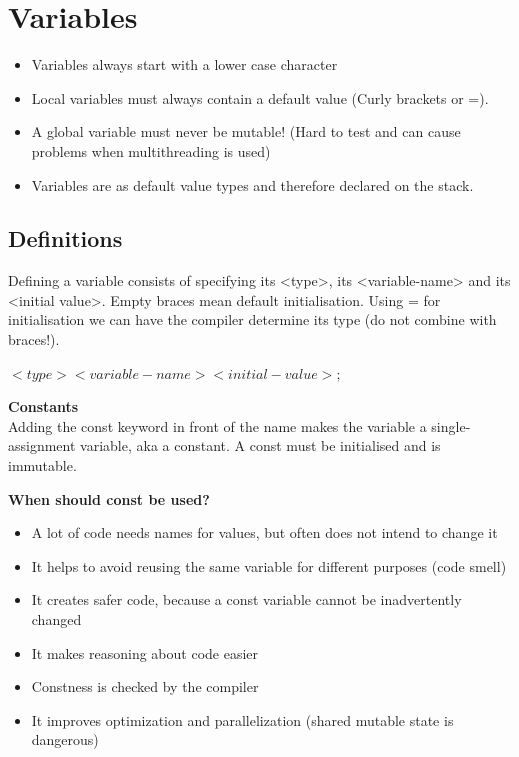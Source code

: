 
\section{Variables}
\begin{itemize}
  \itemsep -0.5em 
  \item Variables always start with a lower case character
  \item Local variables must always contain a default value (Curly brackets or =).
  \item A global variable must never be mutable! (Hard to test and can cause problems when multithreading is used)
  \item Variables are as default value types and therefore declared on the stack.
\end{itemize}

\subsection{Definitions}
Defining a variable consists of specifying its <type>, its <variable-name> and its <initial value>. Empty braces mean default initialisation. Using = for initialisation we can have the compiler determine its type (do not combine with braces!).
\begin{center}
$<type> <variable-name> {<initial-value>};$
\end{center}
\textbf{Constants}\\
 Adding the const keyword in front of the name makes the variable a single-assignment variable, aka a constant. A const must be initialised and is immutable.

\textbf{When should const be used?}
\begin{itemize}
  \itemsep -0.5em 
  \item A lot of code needs names for values, but often does not intend to change it
  \item  It helps to avoid reusing the same variable for different purposes (code smell)
  \item  It creates safer code, because a const variable cannot be inadvertently changed
  \item It makes reasoning about code easier
  \item  Constness is checked by the compiler
  \item  It improves optimization and parallelization (shared mutable state is dangerous) 
\end{itemize}

